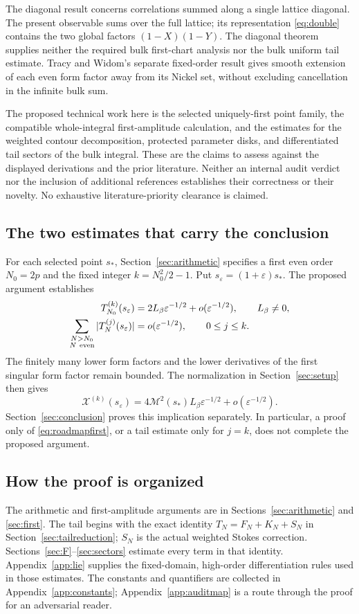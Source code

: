 \documentclass[11pt]{article}
\numberwithin{equation}{section}
\theoremstyle{definition}
\newcommand{\eps}{\varepsilon}
\newcommand{\M}{\mathcal M}
\begin{document}
The diagonal result concerns correlations summed along a single
lattice diagonal. The present observable sums over the full lattice;
its representation \eqref{eq:double} contains the two global factors
\((1-X)(1-Y)\). The diagonal theorem supplies neither the required
bulk first-chart analysis nor the bulk uniform tail estimate.
Tracy and Widom's separate fixed-order result \cite{TW2014}
gives smooth extension of each even form factor away from its Nickel
set, without excluding cancellation in the infinite bulk sum.

The proposed technical work here is the selected uniquely-first point
family, the compatible whole-integral first-amplitude calculation,
and the estimates for the weighted contour decomposition, protected
parameter disks, and differentiated tail sectors of the bulk integral.
These are the claims to assess against the displayed derivations and
the prior literature. Neither an internal audit verdict nor the
inclusion of additional references establishes their correctness or
their novelty. No exhaustive literature-priority clearance is claimed.

\subsection{The two estimates that carry the conclusion}
For each selected point \(s_*\), Section~\ref{sec:arithmetic} specifies
a first even order \(N_0=2p\) and the fixed integer
\(k=N_0^2/2-1\). Put \(s_\eps=(1+\eps)s_*\). The proposed argument
establishes
\begin{align}
 T_{N_0}^{(k)}(s_\eps)
   &=2L_\beta\eps^{-1/2}+o(\eps^{-1/2}),\qquad L_\beta\ne0,
       \label{eq:roadmapfirst}\\
 \sum_{\substack{N>N_0\\N\ {\rm even}}}
       |T_N^{(j)}(s_\eps)|
   &=o(\eps^{-1/2}),\qquad 0\le j\le k .
       \label{eq:roadmaptail}
\end{align}
The finitely many lower form factors and the lower derivatives of the
first singular form factor remain bounded. The normalization in
Section~\ref{sec:setup} then gives
\[
 \mathcal X^{(k)}(s_\eps)
   =4\M^2(s_*)L_\beta\eps^{-1/2}+o(\eps^{-1/2}).
\]
Section~\ref{sec:conclusion} proves this implication separately.
In particular, a proof only of \eqref{eq:roadmapfirst}, or a tail
estimate only for \(j=k\), does not complete the proposed argument.

\subsection{How the proof is organized}
The arithmetic and first-amplitude arguments are in
Sections~\ref{sec:arithmetic} and \ref{sec:first}. The tail begins
with the exact identity \(T_N=F_N+K_N+S_N\) in
Section~\ref{sec:tailreduction}; \(S_N\) is the actual weighted
Stokes correction. Sections~\ref{sec:F}--\ref{sec:sectors} estimate
every term in that identity. Appendix~\ref{app:lie} supplies the
fixed-domain, high-order differentiation rules used in those estimates.
The constants and quantifiers are collected in
Appendix~\ref{app:constants}; Appendix~\ref{app:auditmap} is a route
through the proof for an adversarial reader.
\end{document}
